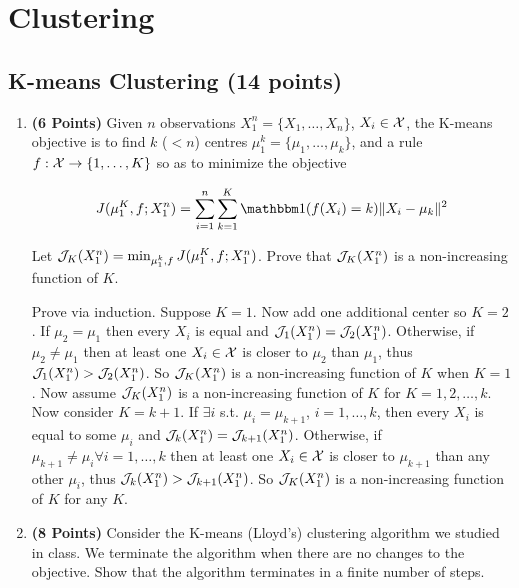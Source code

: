 \section{Clustering}

\subsection{K-means Clustering (14 points)}

\begin{enumerate}

\item \textbf{(6 Points)}
Given $n$ observations $X_1^n = \{X_1, \dots, X_n\}$, $X_i \in \mathcal{X}$, the K-means objective
is to find $k$
($<n$) centres $\mu_1^k = \{\mu_1, \dots, \mu_k\}$, and a rule $f:\mathcal{X} \rightarrow
\{1,\dots, K\}$ so as to minimize the objective

\begin{equation}
J(\mu_1^K, f; X_1^n) = \sum_{i=1}^n \sum_{k=1}^K \indfone(f(X_i) = k) \|X_i - \mu_k\|^2
\label{eqn:kmeans}
\end{equation}

Let $\mathcal{J}_K(X_1^n) = \min_{\mu_1^k, f} J(\mu_1^K, f; X_1^n)$. Prove that
$\mathcal{J}_{K}(X_1^n)$ is a non-increasing function of $K$.

\begin{soln}
    Prove via induction. 
    Suppose $K = 1$. 
    Now add one additional center so $K = 2$.
    If $\mu_2 = \mu_1$ then every $X_i$ is equal and $\mathcal{J}_1(X_1^n) = \mathcal{J}_2(X_1^n)$.
    Otherwise, if $\mu_2 \neq \mu_1$ then at least one $X_i \in \mathcal{X}$ is closer to $\mu_2$ than $\mu_1$, thus $\mathcal{J}_1(X_1^n) > \mathcal{J}_2(X_1^n)$.
    So $\mathcal{J}_{K}(X_1^n)$ is a non-increasing function of $K$ when $K = 1$.
    Now assume $\mathcal{J}_{K}(X_1^n)$ is a non-increasing function of $K$ for $K = 1, 2, \dots, k$.
    Now consider $K = k + 1$.
    If $\exists i$ s.t. $\mu_i = \mu_{k+1}$, $i = 1, \dots, k$, then every $X_i$ is equal to some $\mu_i$ and $\mathcal{J}_k(X_1^n) = \mathcal{J}_{k+1}(X_1^n)$.
    Otherwise, if $\mu_{k+1} \neq \mu_i \forall i = 1, \dots, k$ then at least one $X_i \in \mathcal{X}$ is closer to $\mu_{k+1}$ than any other $\mu_i$, thus $\mathcal{J}_k(X_1^n) > \mathcal{J}_{k+1}(X_1^n)$.
    So $\mathcal{J}_{K}(X_1^n)$ is a non-increasing function of $K$ for any $K$.
\end{soln}

\item \textbf{(8 Points)}
Consider the K-means (Lloyd's) clustering algorithm we studied in class. We
terminate the algorithm when there are no changes to the objective.
Show that the algorithm terminates in a finite number of steps.


\end{enumerate}
